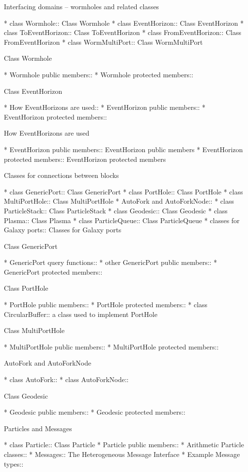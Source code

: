 \begin{menu}
Interfacing domains -- wormholes and related classes

* class Wormhole::		Class Wormhole
* class EventHorizon::		Class EventHorizon
* class ToEventHorizon::	Class ToEventHorizon
* class FromEventHorizon::	Class FromEventHorizon
* class WormMultiPort::		Class WormMultiPort

Class Wormhole

* Wormhole public members::	
* Wormhole protected members::	

Class EventHorizon

* How EventHorizons are used::	
* EventHorizon public members::	 
* EventHorizon protected members::  

How EventHorizons are used

* EventHorizon public members::  EventHorizon public members
* EventHorizon protected members::  EventHorizon protected members

Classes for connections between blocks

* class GenericPort::		Class GenericPort
* class PortHole::		Class PortHole
* class MultiPortHole::		Class MultiPortHole
* AutoFork and AutoForkNode::	
* class ParticleStack::		Class ParticleStack
* class Geodesic::		Class Geodesic
* class Plasma::		Class Plasma
* class ParticleQueue::		Class ParticleQueue
* classes for Galaxy ports::	Classes for Galaxy ports

Class GenericPort

* GenericPort query functions::	 
* other GenericPort public members::  
* GenericPort protected members::  

Class PortHole

* PortHole public members::	
* PortHole protected members::	
* class CircularBuffer::	a class used to implement PortHole

Class MultiPortHole

* MultiPortHole public members::  
* MultiPortHole protected members::  

AutoFork and AutoForkNode

* class AutoFork::		
* class AutoForkNode::		

Class Geodesic

* Geodesic public members::	
* Geodesic protected members::	

Particles and Messages

* class Particle::		Class Particle
* Particle public members::	
* Arithmetic Particle classes::	 
* Messages::			The Heterogeneous Message Interface
* Example Message types::	


\end{menu}
